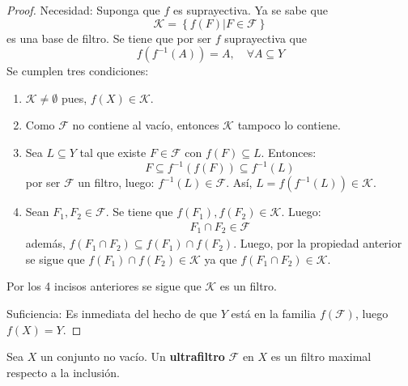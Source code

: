 \documentclass[12pt]{report}
\theoremstyle{largebreak}
\begin{document}
    \begin{proof}
        Necesidad: Suponga que $f$ es suprayectiva. Ya se sabe que
        \begin{equation*}
            \mathcal{K}=\left\{f(F)\Big|F\in\mathcal{F} \right\}
        \end{equation*}
        es una base de filtro. Se tiene que por ser $f$ suprayectiva que
        \begin{equation*}
            f(f^{-1}(A))=A,\quad\forall A\subseteq Y
        \end{equation*}
        Se cumplen tres condiciones:
        \begin{enumerate}
            \item $\mathcal{K}\neq\emptyset$ pues, $f(X)\in\mathcal{K}$.
            \item Como $\mathcal{F}$ no contiene al vacío, entonces $\mathcal{K}$ tampoco lo contiene.
            \item Sea $L\subseteq Y$ tal que existe $F\in\mathcal{F}$ con $f(F)\subseteq L$. Entonces:
            \begin{equation*}
                F\subseteq f^{-1}(f(F))\subseteq f^{-1}(L)
            \end{equation*}
            por ser $\mathcal{F}$ un filtro, luego: $f^{-1}(L)\in\mathcal{F}$. Así, $L=f(f^{-1}(L))\in\mathcal{K}$.
            \item Sean $F_1,F_2\in\mathcal{F}$. Se tiene que $f(F_1),f(F_2)\in\mathcal{K}$. Luego:
            \begin{equation*}
                \begin{split}
                    F_1\cap F_2\in\mathcal{F}
                \end{split}
            \end{equation*}
            además, $f(F_1\cap F_2)\subseteq f(F_1)\cap f(F_2)$. Luego, por la propiedad anterior se sigue que $f(F_1)\cap f(F_2)\in\mathcal{K}$ ya que $f(F_1\cap F_2)\in\mathcal{K}$.
        \end{enumerate}
        Por los 4 incisos anteriores se sigue que $\mathcal{K}$ es un filtro.

        Suficiencia: Es inmediata del hecho de que $Y$ está en la familia $f(\mathcal{F})$, luego $f(X)=Y$.

    \end{proof}

    \begin{mydef}
        Sea $X$ un conjunto no vacío. Un \textbf{ultrafiltro} $\mathcal{F}$ en $X$ es un filtro maximal respecto a la inclusión.
    \end{mydef}
\end{document}
